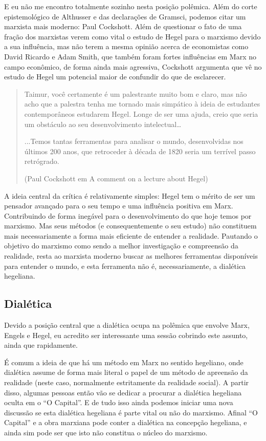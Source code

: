 E eu não me encontro totalmente sozinho nesta posição polêmica. Além do corte epistemológico de Althusser e das declarações de Gramsci, podemos citar um marxista mais moderno: Paul Cockshott. Além de questionar o fato de uma fração dos marxistas verem como vital o estudo de Hegel para o marxismo devido a sua influência, mas não terem a mesma opinião acerca de economistas como David Ricardo e Adam Smith, que também foram fortes influências em Marx no campo econômico, de forma ainda mais agressiva, Cockshott argumenta que vê no estudo de Hegel um potencial maior de confundir do que de esclarecer.

\begin{quote}
Taimur, você certamente é um palestrante muito bom e claro, mas não acho que a palestra tenha me tornado mais simpático à ideia de estudantes contemporâneos estudarem Hegel. Longe de ser uma ajuda, creio que seria um obstáculo ao seu desenvolvimento intelectual…

...Temos tantas ferramentas para analisar o mundo, desenvolvidas nos últimos 200 anos, que retroceder à década de 1820 seria um terrível passo retrógrado.

(Paul Cockshott em A comment on a lecture about Hegel)
\end{quote}

A ideia central da crítica é relativamente simples: Hegel tem o mérito de ser um pensador avançado para o seu tempo e uma influência positiva em Marx. Contribuindo de forma inegável para o desenvolvimento do que hoje temos por marxismo. Mas seus métodos (e consequentemente o seu estudo) não constituem mais necessariamente a forma mais eficiente de entender a realidade. Pautando o objetivo do marxismo como sendo a melhor investigação e compreensão da realidade, resta ao marxista moderno buscar as melhores ferramentas disponíveis para entender o mundo, e esta ferramenta não é, necessariamente, a dialética hegeliana.

\subsection{Dialética}

Devido a posição central que a dialética ocupa na polêmica que envolve Marx, Engels e Hegel, eu acredito ser interessante uma sessão cobrindo este assunto, ainda que rapidamente.

É comum a ideia de que há um método em Marx no sentido hegeliano, onde dialética assume de forma mais literal o papel de um método de apreensão da realidade (neste caso, normalmente estritamente da realidade social). A partir disso, algumas pessoas então vão se dedicar a procurar a dialética hegeliana oculta em o “O Capital”. E de tudo isso ainda podemos iniciar uma nova discussão se esta dialética hegeliana é parte vital ou não do marxismo. Afinal “O Capital” e a obra marxiana pode conter a dialética na concepção hegeliana, e ainda sim pode ser que isto não constitua o núcleo do marxismo.

